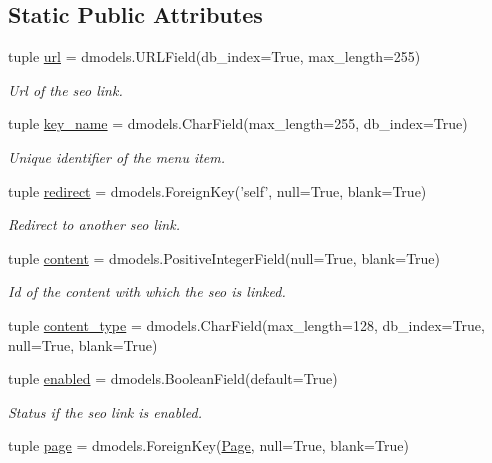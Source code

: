 \subsection*{Static Public Attributes}
\begin{DoxyCompactItemize}
\item 
tuple \hyperlink{classcore_1_1models_1_1Seo_a7d34532dc903e2764ef053b995d9a0f9}{url} = dmodels.\-U\-R\-L\-Field(db\-\_\-index=True, max\-\_\-length=255)
\begin{DoxyCompactList}\small\item\em Url of the seo link. \end{DoxyCompactList}\item 
tuple \hyperlink{classcore_1_1models_1_1Seo_a644a0f17aaa68dc004c064e4f8be688d}{key\-\_\-name} = dmodels.\-Char\-Field(max\-\_\-length=255, db\-\_\-index=True)
\begin{DoxyCompactList}\small\item\em Unique identifier of the menu item. \end{DoxyCompactList}\item 
tuple \hyperlink{classcore_1_1models_1_1Seo_a67e819a81be21ee3247e3f0d733d6772}{redirect} = dmodels.\-Foreign\-Key('self', null=True, blank=True)
\begin{DoxyCompactList}\small\item\em Redirect to another seo link. \end{DoxyCompactList}\item 
tuple \hyperlink{classcore_1_1models_1_1Seo_a75b7a9a79c0c67e3c225b9b3e2dac2ea}{content} = dmodels.\-Positive\-Integer\-Field(null=True, blank=True)
\begin{DoxyCompactList}\small\item\em Id of the content with which the seo is linked. \end{DoxyCompactList}\item 
tuple \hyperlink{classcore_1_1models_1_1Seo_ac102fd07ac9043d0b8f84fd7079e4eb0}{content\-\_\-type} = dmodels.\-Char\-Field(max\-\_\-length=128, db\-\_\-index=True, null=True, blank=True)
\item 
tuple \hyperlink{classcore_1_1models_1_1Seo_a7c32328ad2bf566ea1902cbe0d9c541c}{enabled} = dmodels.\-Boolean\-Field(default=True)
\begin{DoxyCompactList}\small\item\em Status if the seo link is enabled. \end{DoxyCompactList}\item 
tuple \hyperlink{classcore_1_1models_1_1Seo_ae72954b787413173ed2e710d3add951a}{page} = dmodels.\-Foreign\-Key(\hyperlink{classcore_1_1models_1_1Page}{Page}, null=True, blank=True)

\end{DoxyCompactItemize}
